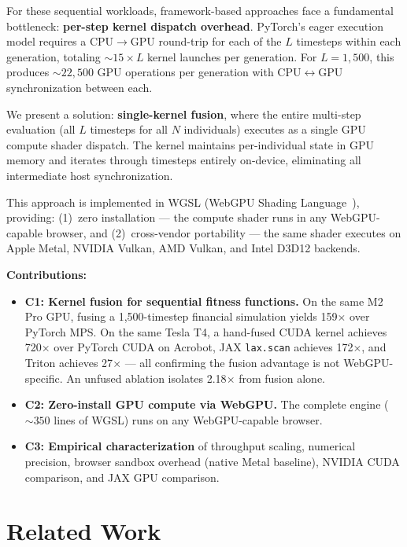 \documentclass[sigconf,nonacm]{acmart}
\begin{document}
For these sequential workloads, framework-based approaches face a fundamental bottleneck: \textbf{per-step kernel dispatch overhead}. PyTorch's eager execution model requires a CPU$\to$GPU round-trip for each of the $L$ timesteps within each generation, totaling ${\sim}15 \times L$ kernel launches per generation. For $L = 1{,}500$, this produces ${\sim}22{,}500$ GPU operations per generation with CPU$\leftrightarrow$GPU synchronization between each.

We present a solution: \textbf{single-kernel fusion}, where the entire multi-step evaluation (all $L$ timesteps for all $N$ individuals) executes as a single GPU compute shader dispatch. The kernel maintains per-individual state in GPU memory and iterates through timesteps entirely on-device, eliminating all intermediate host synchronization.

This approach is implemented in WGSL (WebGPU Shading Language~\cite{w3c2023}), providing: (1)~zero installation --- the compute shader runs in any WebGPU-capable browser, and (2)~cross-vendor portability --- the same shader executes on Apple Metal, NVIDIA Vulkan, AMD Vulkan, and Intel D3D12 backends.

\textbf{Contributions:}
\begin{itemize}
  \item \textbf{C1: Kernel fusion for sequential fitness functions.} On the same M2 Pro GPU, fusing a 1,500-timestep financial simulation yields 159$\times$ over PyTorch MPS. On the same Tesla T4, a hand-fused CUDA kernel achieves 720$\times$ over PyTorch CUDA on Acrobot, JAX \texttt{lax.scan} achieves 172$\times$, and Triton achieves 27$\times$ --- all confirming the fusion advantage is not WebGPU-specific. An unfused ablation isolates 2.18$\times$ from fusion alone.
  \item \textbf{C2: Zero-install GPU compute via WebGPU.} The complete engine (${\sim}350$ lines of WGSL) runs on any WebGPU-capable browser.
  \item \textbf{C3: Empirical characterization} of throughput scaling, numerical precision, browser sandbox overhead (native Metal baseline), NVIDIA CUDA comparison, and JAX GPU comparison.
\end{itemize}

\section{Related Work}
\end{document}
